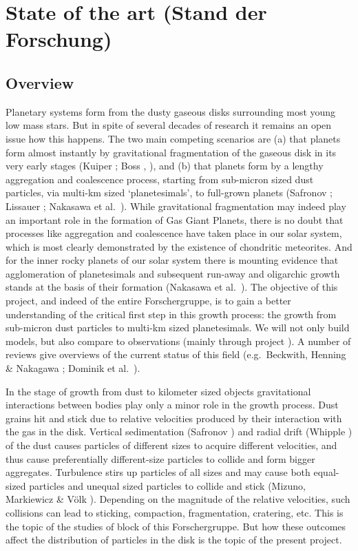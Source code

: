 \section{State of the art (Stand der Forschung)}
\subsection{Overview}
Planetary systems form from the dusty gaseous disks surrounding most young
low mass stars. But in spite of several decades of research it remains an
open issue how this happens. The two main competing scenarios are (a) that
planets form almost instantly by gravitational fragmentation of the gaseous
disk in its very early stages (Kuiper ; Boss
, ), and (b) that planets form by a lengthy aggregation
and coalescence process, starting from sub-micron sized dust particles, via
multi-km sized `planetesimals', to full-grown planets (Safronov ;
Lissauer ; Nakasawa et al.~). While gravitational
fragmentation may indeed play an important role in the formation of Gas
Giant Planets, there is no doubt that processes like aggregation and
coalescence have taken place in our solar system, which is most clearly
demonstrated by the existence of chondritic meteorites. And for the inner
rocky planets of our solar system there is mounting evidence that
agglomeration of planetesimals and subsequent run-away and oligarchic growth
stands at the basis of their formation (Nakasawa et al.~). The
objective of this project, and indeed of the entire Forschergruppe, is to
gain a better understanding of the critical first step in this growth
process: the growth from sub-micron dust particles to multi-km sized
planetesimals. We will not only build models, but also compare to
observations (mainly through project \projwolf{}).
A number of reviews give overviews of the current status
of this field (e.g.~Beckwith, Henning \& Nakagawa ; Dominik et
al.~).

In the stage of growth from dust to kilometer sized objects gravitational
interactions between bodies play only a minor role in the growth
process. Dust grains hit and stick due to relative velocities produced by
their interaction with the gas in the disk.  Vertical sedimentation
(Safronov ) and radial drift (Whipple ) of the dust
causes particles of different sizes to acquire different velocities, and
thus cause preferentially different-size particles to collide and form
bigger aggregates. Turbulence stirs up particles of all sizes and may cause
both equal-sized particles and unequal sized particles to collide and stick
(Mizuno, Markiewicz \& V\"olk ). Depending on the magnitude of the
relative velocities, such collisions can lead to sticking, compaction,
fragmentation, cratering, etc. This is the topic of the studies of
block \blockimpact{} of this Forschergruppe. 
But how these outcomes affect the distribution of particles in the
disk is the topic of the present project.

